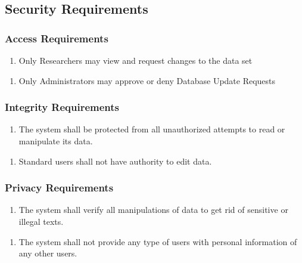 \documentclass[]{article}
\begin{document}

\subsection{Security Requirements}
\label{sub:security_requirements}

\subsubsection{Access Requirements}
\label{ssub:access_requirements}
\begin{enumerate}[{SR}1.]
	\item {\color{red} Only Researchers may view and request changes to the data set}
\end{enumerate}
\begin{enumerate}[{SR}2.]
	\item {\color{red} Only Administrators may approve or deny Database Update Requests}
\end{enumerate}

\subsubsection{Integrity Requirements}
\label{ssub:integrity_requirements}
	\begin{enumerate}[{SR}3.]
	\item {\color{red}The system shall be protected from all unauthorized attempts to read or manipulate its data.}
	\end{enumerate}
	\begin{enumerate}[{SR}4.]
	\item Standard users shall not have authority to edit data.
\end{enumerate}

\subsubsection{Privacy Requirements}
\label{ssub:privacy_requirements}
\begin{enumerate}[{SR}5.]
	\item The system shall verify all manipulations of data to get rid of sensitive or illegal texts.
\end{enumerate}
\begin{enumerate}[{SR}6.]
	\item The system shall not provide any type of users with personal information of any other users.
\end{enumerate}
\end{document}
